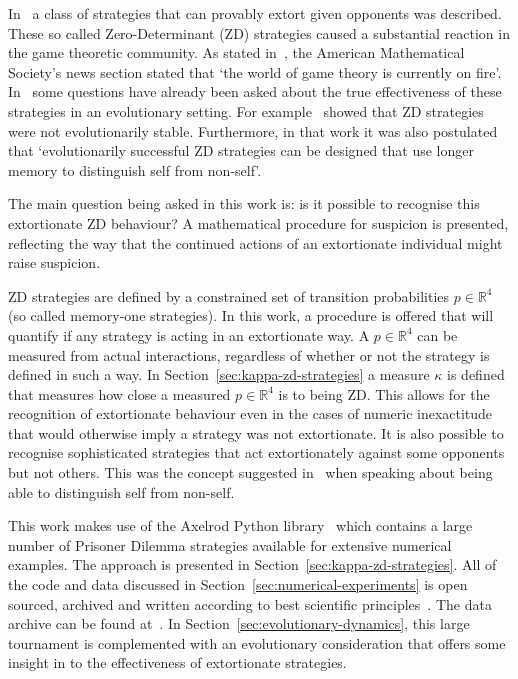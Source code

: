 \documentclass[a4paper]{article}
\begin{document}
In~\cite{Press2012} a class of strategies that can provably extort given
opponents was described. These so called Zero-Determinant (ZD) strategies caused
a substantial reaction in the game theoretic community. As stated
in~\cite{hilbe2015partners}, the American Mathematical Society's news section
stated that `the world of game theory is currently on fire'.
In~\cite{adami2013evolutionary, Hilbe2013, hilbe2013adaptive, hilbe2015partners,
ichinose2018zero, Moran1707} some questions have already been asked about the
true effectiveness of these strategies in an evolutionary setting. For
example~\cite{adami2013evolutionary} showed that ZD strategies were not
evolutionarily stable. Furthermore, in that work it was also postulated that
`evolutionarily successful ZD strategies can be designed that use longer memory
to distinguish self from non-self'.

The main question being asked in this work is: is it possible to recognise this
extortionate ZD behaviour? A mathematical procedure for suspicion is presented,
reflecting the way that the continued actions of an extortionate individual
might raise suspicion.

ZD strategies are defined by a constrained set of transition probabilities
\(p\in\mathbb{R}^4\) (so called memory-one strategies). In this work, a
procedure is offered that will quantify if any strategy is acting in an
extortionate way. A \(p\in\mathbb{R}^4\) can be measured from actual
interactions, regardless of whether or not the strategy is defined in such a
way. In Section~\ref{sec:kappa-zd-strategies} a measure \(\kappa\) is defined
that measures how close a measured \(p\in\mathbb{R}^4\) is to being ZD.
This allows for the
recognition of extortionate behaviour even in the cases of numeric inexactitude
that would otherwise imply a strategy was not extortionate. It is also possible
to recognise sophisticated strategies that act extortionately against some
opponents but not others. This was the concept suggested
in~\cite{adami2013evolutionary} when speaking about being able to distinguish
self from non-self.

This work makes use of the Axelrod Python library~\cite{Knight2016, Knight2018}
which contains a large number of Prisoner Dilemma strategies available for
extensive numerical examples.  The approach is presented in
Section~\ref{sec:kappa-zd-strategies}.  All of the code and data discussed in
Section~\ref{sec:numerical-experiments} is open sourced, archived and written
according to best scientific principles~\cite{Wilson2014}. The data archive can
be found at~\cite{vincent_knight_2018_1297075}.  In
Section~\ref{sec:evolutionary-dynamics}, this large tournament is complemented
with an evolutionary consideration that offers some insight in to the
effectiveness of extortionate strategies.
\end{document}
